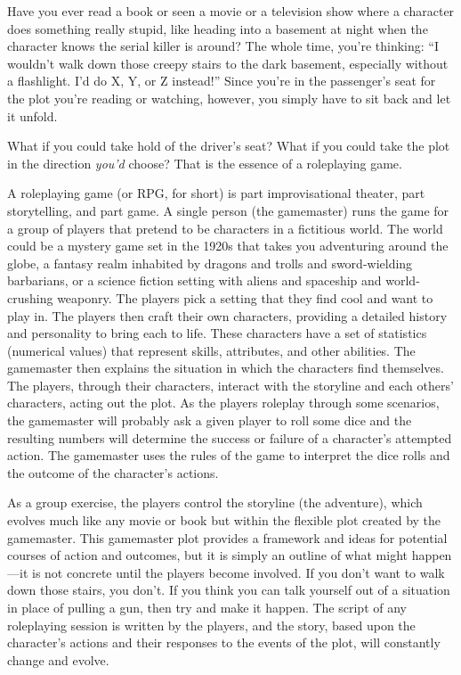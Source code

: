 Have you ever read a book or seen a movie or a television show where a character does something really 
stupid, like heading into a basement at night when the 
character knows the serial killer is around? The whole 
time, you're thinking: ``I wouldn't walk down those 
creepy stairs to the dark basement, especially without a 
flashlight. I'd do X, Y, or Z instead!'' Since you're in the 
passenger's seat for the plot you're reading or watching, 
however, you simply have to sit back and let it unfold. 

What if you could take hold of the driver's seat? 
What if you could take the plot in the direction \textit{you'd} 
choose? That is the essence of a roleplaying game.

A roleplaying game (or RPG, for short) is part improvisational theater, part storytelling, and part game. 
A single person (the gamemaster) runs the game for 
a group of players that pretend to be characters in a 
fictitious world. The world could be a mystery game 
set in the 1920s that takes you adventuring around 
the globe, a fantasy realm inhabited by dragons 
and trolls and sword-wielding barbarians, or a science fiction setting with aliens and spaceship and 
world-crushing weaponry. The players pick a setting 
that they find cool and want to play in. The players 
then craft their own characters, providing a detailed 
history and personality to bring each to life. These 
characters have a set of statistics (numerical values) 
that represent skills, attributes, and other abilities. 
The gamemaster then explains the situation in which 
the characters find themselves. The players, through 
their characters, interact with the storyline and each 
others' characters, acting out the plot. As the players 
roleplay through some scenarios, the gamemaster will 
probably ask a given player to roll some dice and the 
resulting numbers will determine the success or failure 
of a character's attempted action. The gamemaster 
uses the rules of the game to interpret the dice rolls 
and the outcome of the character's actions.

As a group exercise, the players control the storyline 
(the adventure), which evolves much like any movie or 
book but within the flexible plot created by the gamemaster. This gamemaster plot provides a framework 
and ideas for potential courses of action and outcomes, 
but it is simply an outline of what might happen—it 
is not concrete until the players become involved. If 
you don't want to walk down those stairs, you don't. 
If you think you can talk yourself out of a situation 
in place of pulling a gun, then try and make it happen. 
The script of any roleplaying session is written by the 
players, and the story, based upon the character's actions and their responses to the events of the plot, will 
constantly change and evolve.

